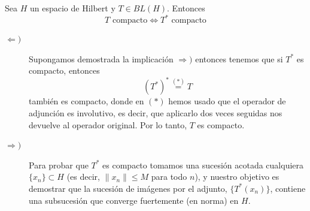 \begin{ejercicio}
    Sea $H$ un espacio de Hilbert y $T \in BL(H)$. Entonces 
    \begin{equation*}
        T \text{ compacto} \iff T^* \text{ compacto}
    \end{equation*}
    \begin{description}
        \item[$\Longleftarrow)$] Supongamos demostrada la implicación $\Longrightarrow)$ entonces tenemos que si $T^*$ es compacto, entonces 
        $$(T^*)^* \overset{(*)}{=} T$$
        también es compacto, donde en $(*)$ hemos usado que el operador de adjunción es involutivo, es decir, que aplicarlo dos veces seguidas nos devuelve al operador original. Por lo tanto, $T$ es compacto.

        \item[$\Longrightarrow)$] Para probar que $T^*$ es compacto tomamos una sucesión acotada cualquiera $\{x_n\} \subset H$ (es decir, $\|x_n\| \le M$ para todo $n$), y nuestro objetivo es demostrar que la sucesión de imágenes por el adjunto, $\{T^*(x_n)\}$, contiene una subsucesión que converge fuertemente (en norma) en $H$. \\


\end{description}
\end{ejercicio}
